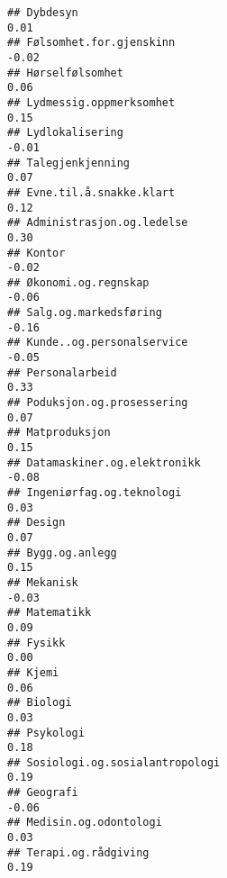\documentclass[
]{article}
\begin{document}
\begin{verbatim}
## Dybdesyn                                                                          0.01
## Følsomhet.for.gjenskinn                                                          -0.02
## Hørselfølsomhet                                                                   0.06
## Lydmessig.oppmerksomhet                                                           0.15
## Lydlokalisering                                                                  -0.01
## Talegjenkjenning                                                                  0.07
## Evne.til.å.snakke.klart                                                           0.12
## Administrasjon.og.ledelse                                                         0.30
## Kontor                                                                           -0.02
## Økonomi.og.regnskap                                                              -0.06
## Salg.og.markedsføring                                                            -0.16
## Kunde..og.personalservice                                                        -0.05
## Personalarbeid                                                                    0.33
## Poduksjon.og.prosessering                                                         0.07
## Matproduksjon                                                                     0.15
## Datamaskiner.og.elektronikk                                                      -0.08
## Ingeniørfag.og.teknologi                                                          0.03
## Design                                                                            0.07
## Bygg.og.anlegg                                                                    0.15
## Mekanisk                                                                         -0.03
## Matematikk                                                                        0.09
## Fysikk                                                                            0.00
## Kjemi                                                                             0.06
## Biologi                                                                           0.03
## Psykologi                                                                         0.18
## Sosiologi.og.sosialantropologi                                                    0.19
## Geografi                                                                         -0.06
## Medisin.og.odontologi                                                             0.03
## Terapi.og.rådgiving                                                               0.19

\end{verbatim}
\end{document}
